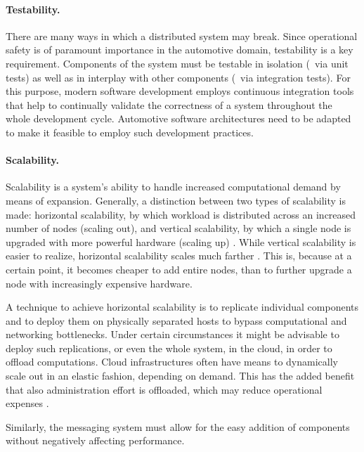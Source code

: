 \paragraph{Testability.}
There are many ways in which a distributed system may break. Since operational safety is of paramount importance in the automotive domain, testability is a key requirement. Components of the system must be testable in isolation (\eg\ via unit tests) as well as in interplay with other components (\eg\ via integration tests). For this purpose, modern software development employs continuous integration tools that help to continually validate the correctness of a system throughout the whole development cycle. Automotive software architectures need to be adapted to make it feasible to employ such development practices.


\paragraph{Scalability.}
Scalability  is a system's ability to handle increased computational demand by means of expansion. Generally, a distinction between two types of scalability is made: horizontal scalability, by which workload is distributed across an increased number of nodes (scaling out), and vertical scalability, by which a single node is upgraded with more powerful hardware (scaling up) \cite{tanenbaum2017distributed}. While vertical scalability is easier to realize, horizontal scalability scales much farther . This is, because at a certain point, it becomes cheaper to add entire nodes, than to further upgrade a node with increasingly expensive hardware.

A technique to achieve horizontal scalability is to replicate individual components and to deploy them on physically separated hosts to bypass computational and networking bottlenecks. Under certain circumstances it might be advisable to deploy such replications, or even the whole system, in the cloud, in order to offload computations. Cloud infrastructures often have means to dynamically scale out in an elastic fashion, depending on demand. This has the added benefit that also administration effort is offloaded, which may reduce operational expenses \cite{vaquero2011dynamically}.

Similarly, the messaging system must allow for the easy addition of components without negatively affecting performance.

%
%
%
%
%
%
%
%
%
%

